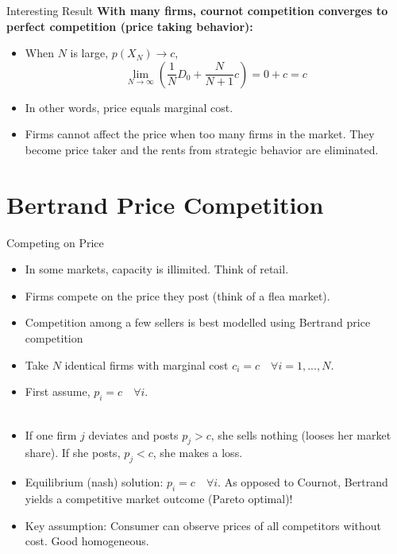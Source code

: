 \documentclass[handout]{beamer}
\newenvironment{iPar}[1]{\textbf{#1} \begin{itemize}}{\end{itemize}}
\begin{document}
\begin{frame}{Interesting Result}
\begin{iPar}{With many firms, cournot competition converges to perfect competition (price taking behavior):}
\item When $N$ is large, $p(X_N) \to c$, $$ \lim_{N \to \infty} \left( \frac{1}{N}D_0 +\frac{N}{N+1}c \right) = 0 + c = c$$
\item In other words, price equals marginal cost.
\item Firms cannot affect the price when too many firms in the market. They become price taker and the rents from strategic behavior are eliminated. 
\end{iPar}
\end{frame}

\section{Bertrand Price Competition}

\begin{frame}{Competing on Price}
\begin{itemize}
   \item  In some markets, capacity is illimited. Think of retail. 
   \item Firms compete on the price they post (think of a flea market). 
   \item Competition among a few sellers is best modelled using Bertrand price competition
    \item Take $N$ identical firms with marginal cost $c_i=c \quad \forall i=1,...,N$. 
    \item First assume, $p_i = c \quad \forall i$. \\ \\
    \item If one firm $j$ deviates and posts $p_j>c$, she sells nothing (looses her market share). If she posts, $p_j<c$, she makes a loss. \item Equilibrium (nash) solution: $p_i=c \quad \forall i $. As opposed to Cournot, Bertrand yields a competitive market outcome (Pareto optimal)!
    \item Key assumption: Consumer can observe prices of all competitors without cost. Good homogeneous.
\end{itemize}    
\end{frame}
\end{document}
